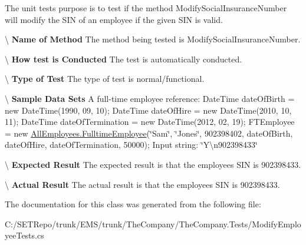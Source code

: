 The unit test\textquotesingle{}s purpose is to test if the method Modify\+Social\+Insurance\+Number will modify the S\+I\+N of an employee if the given S\+I\+N is valid. 

\textbackslash{} {\bfseries  Name of Method} The method being tested is Modify\+Social\+Insurance\+Number.

\textbackslash{} {\bfseries  How test is Conducted} The test is automatically conducted.

\textbackslash{} {\bfseries  Type of Test} The type of test is normal/functional.

\textbackslash{} {\bfseries  Sample Data Sets} A full-\/time employee reference\+: Date\+Time date\+Of\+Birth = new Date\+Time(1990, 09, 10); Date\+Time date\+Of\+Hire = new Date\+Time(2010, 10, 11); Date\+Time date\+Of\+Termination = new Date\+Time(2012, 02, 19); F\+T\+Employee = new \hyperlink{class_all_employees_1_1_fulltime_employee}{All\+Employees.\+Fulltime\+Employee}(\char`\"{}\+Sam\char`\"{}, \char`\"{}\+Jones\char`\"{}, 902398402, date\+Of\+Birth, date\+Of\+Hire, date\+Of\+Termination, 50000); Input string\+: \char`\"{}\+Y\textbackslash{}n902398433\char`\"{}

\textbackslash{} {\bfseries  Expected Result} The expected result is that the employee\textquotesingle{}s S\+I\+N is 902398433.

\textbackslash{} {\bfseries  Actual Result} The actual result is that the employee\textquotesingle{}s S\+I\+N is 902398433. 

The documentation for this class was generated from the following file\+:\begin{DoxyCompactItemize}
\item 
C\+:/\+S\+E\+T\+Repo/trunk/\+E\+M\+S/trunk/\+The\+Company/\+The\+Company.\+Tests/Modify\+Employee\+Tests.\+cs\end{DoxyCompactItemize}
